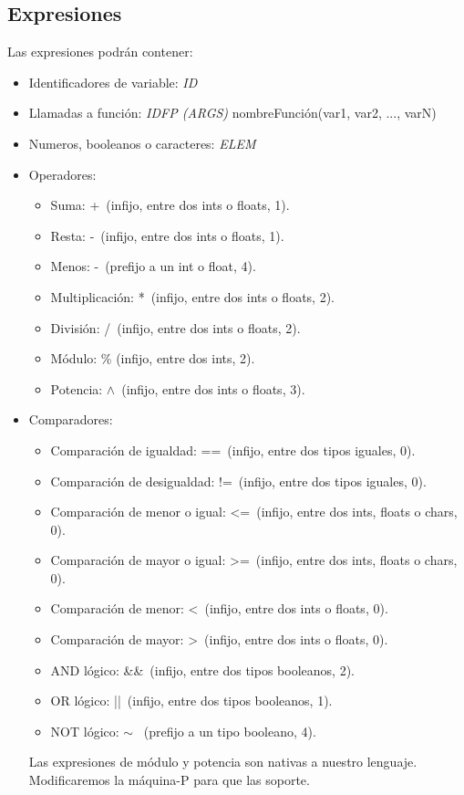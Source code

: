 \documentclass[a4paper, 12pt]{article}
\begin{document}
\subsection{Expresiones}
Las expresiones podrán contener:
\begin{itemize}
\item Identificadores de variable: \textit{ID}
\item Llamadas a función: \textit{IDFP \textrm{(}ARGS\textrm{)}}  nombreFunción(var1, var2, ..., varN)
\item Numeros, booleanos o caracteres: \textit{ELEM}
\item Operadores:
	\begin{itemize}
	\item Suma: +\ (infijo, entre dos ints o floats, 1).
	\item Resta: -\ (infijo, entre dos ints o floats, 1).
	\item Menos: -\ (prefijo a un int o float, 4).
	\item Multiplicación: *\ (infijo, entre dos ints o floats, 2).
	\item División: /\ (infijo, entre dos ints o floats, 2).
	\item Módulo: \% (infijo, entre dos ints, 2).
	\item Potencia: $\wedge$\ (infijo, entre dos ints o floats, 3).
	\end{itemize}
\item Comparadores:
	\begin{itemize}
	\item Comparación de igualdad: ==\ (infijo, entre dos tipos iguales, 0).
	\item Comparación de desigualdad: !=\ (infijo, entre dos tipos iguales, 0).
	\item Comparación de menor o igual: <=\ (infijo, entre dos ints, floats o chars, 0).
	\item Comparación de mayor o igual: >=\ (infijo, entre dos ints, floats o chars, 0).
	\item Comparación de menor: <\ (infijo, entre dos ints o floats, 0).
	\item Comparación de mayor: >\ (infijo, entre dos ints o floats, 0).
	\item AND lógico: \&\&\ (infijo, entre dos tipos booleanos, 2).
	\item OR lógico: ||\ (infijo, entre dos tipos booleanos, 1).
	\item NOT lógico: $\sim$ \ (prefijo a un tipo  booleano, 4).
	\end{itemize}
	
	Las expresiones de módulo y potencia son nativas a nuestro lenguaje. Modificaremos la máquina-P para que las soporte.
	
\end{itemize}
\end{document}
